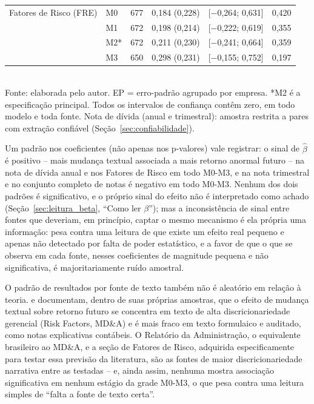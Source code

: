 \documentclass[a4paper,12pt]{report}
\begin{document}
\begin{table}[htbp]
\begin{tabular}{@{}llrrrr@{}}
        Fatores de Risco (FRE)      & M0 & 677 & 0,184 (0,228) & [$-$0,264; 0,631] & 0,420 \\
                                     & M1 & 672 & 0,198 (0,214) & [$-$0,222; 0,619] & 0,355 \\
                                     & M2* & 672 & 0,211 (0,230) & [$-$0,241; 0,664] & 0,359 \\
                                     & M3 & 650 & 0,298 (0,231) & [$-$0,155; 0,752] & 0,197 \\
        \bottomrule
    \end{tabular}
    \\[0.3cm]
    {\footnotesize Fonte: elaborada pelo autor. EP = erro-padrão agrupado por empresa. *M2 é a especificação principal. Todos os intervalos de confiança contêm zero, em todo modelo e toda fonte. Nota de dívida (anual e trimestral): amostra restrita a pares com extração confiável (Seção~\ref{sec:confiabilidade}).}
\end{table}

Um padrão nos coeficientes (não apenas nos p-valores) vale registrar: o sinal de $\hat\beta$ é positivo -- mais mudança textual associada a mais retorno anormal futuro -- na nota de dívida anual e nos Fatores de Risco em todo M0-M3, e na nota trimestral e no conjunto completo de notas é negativo em todo M0-M3. Nenhum dos dois padrões é significativo, e o próprio sinal do efeito não é interpretado como achado (Seção~\ref{sec:leitura_beta}, ``Como ler $\beta$''); mas a inconsistência de sinal entre fontes que deveriam, em princípio, captar o mesmo mecanismo é ela própria uma informação: pesa contra uma leitura de que existe um efeito real pequeno e apenas não detectado por falta de poder estatístico, e a favor de que o que se observa em cada fonte, nesses coeficientes de magnitude pequena e não significativa, é majoritariamente ruído amostral.

O padrão de resultados por fonte de texto também não é aleatório em relação à teoria.  e  documentam, dentro de suas próprias amostras, que o efeito de mudança textual sobre retorno futuro se concentra em texto de alta discricionariedade gerencial (Risk Factors, MD\&A) e é mais fraco em texto formulaico e auditado, como notas explicativas contábeis. O Relatório da Administração, o equivalente brasileiro ao MD\&A, e a seção de Fatores de Risco, adquirida especificamente para testar essa previsão da literatura, são as fontes de maior discricionariedade narrativa entre as testadas -- e, ainda assim, nenhuma mostra associação significativa em nenhum estágio da grade M0-M3, o que pesa contra uma leitura simples de ``falta a fonte de texto certa''.
\end{document}
